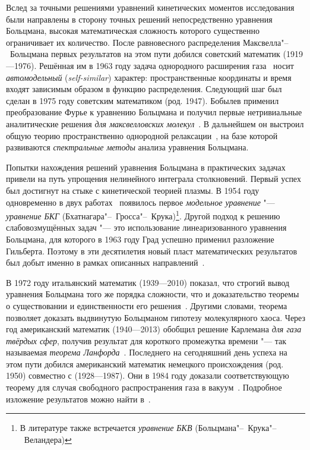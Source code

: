 \documentclass[a4paper, 12pt, oneside]{article} %
\begin{document}
Вслед за точными решениями уравнений кинетических моментов исследования
были направлены в сторону точных решений непосредственно уравнения
Больцмана, высокая математическая сложность которого существенно
ограничивает их количество. После равновесного распределения
Максвелла"--~Больцмана первых результатов на этом пути добился советский
математик  (1919---1976). Решённая им в
1963 году задача однородного расширения
газа~\cite{nikolskii1963selfsimilar} носит \emph{автомодельный}
(\emph{self-similar}) характер: пространственные координаты и время
входят зависимым образом в функцию распределения. Следующий шаг был
сделан в 1975 году советским математиком  (род. 1947).
Бобылев применил преобразование Фурье к уравнению Больцмана и получил
первые нетривиальные аналитические решения \emph{для максвелловских
молекул}~\cite{bobylev1975solution}. В дальнейшем он выстроил общую
теорию пространственно однородной релаксации~\cite{bobylev1984exact}, на
базе которой развиваются \emph{спектральные методы} анализа уравнения
Больцмана. 

Попытки нахождения решений уравнения Больцмана в практических задачах
привели на путь упрощения нелинейного интеграла столкновений. Первый
успех был достигнут на стыке с кинетической теорией плазмы. В 1954 году
одновременно в двух работах~\cite{bhatnagar1954model,
welander1954temperature} появилось первое \emph{модельное уравнение}
"--- \emph{уравнение БКГ} (Бхатнагара"--~Гросса"--~Крука)\footnote{В
литературе также встречается \emph{уравнение БКВ}
(Больцмана"--~Крука"--~Веландера)}. Другой подход к решению
слабовозмущённых задач "--- это использование линеаризованного уравнения
Больцмана, для которого в 1963 году Град успешно применил разложение
Гильберта. Поэтому в эти десятилетия новый пласт математических
результатов был добыт именно в рамках описанных
направлений~\cite{cercignani1973mathematical}.

В 1972 году итальянский математик 
(1939---2010) показал, что строгий вывод уравнения Больцмана того же
порядка сложности, что и доказательство теоремы о существовании и
единственности его решения~\cite{cercignani1972boltzmann}. Другими
словами, теорема позволяет доказать выдвинутую Больцманом гипотезу
молекулярного хаоса. Через год американский математик  (1940---2013) обобщил решение Карлемана \emph{для газа твёрдых
сфер}, получив результат для короткого промежутка времени "--- так
называемая \emph{теорема Ланфорда}~\cite{lanford1975time}. Последнего на
сегодняшний день успеха на этом пути добился американский математик
немецкого происхождения  (род. 1950) совместно с
 (1928---1987). Они в 1984 году доказали
соответствующую теорему для случая свободного распространения газа в
вакуум~\cite{illner1984boltzmann}. Подробное изложение результатов можно
найти в~\cite{cercignani1994mathematical}.
\end{document}
